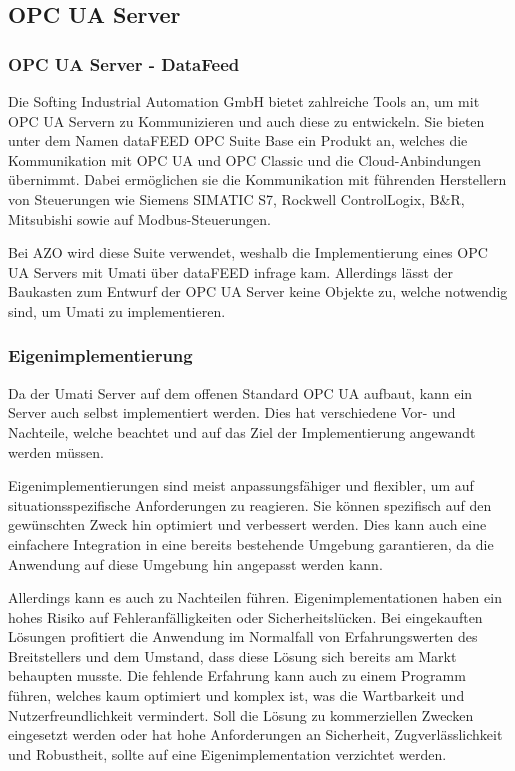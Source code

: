 \documentclass[a4paper, 12pt, oneside, toc=listofnumbered, bibliography=totoc]{scrbook}
\begin{document}
		\subsection{OPC UA Server}
		
			\subsubsection{OPC UA Server - DataFeed}
				
			Die Softing Industrial Automation GmbH bietet zahlreiche Tools an, um mit OPC UA Servern zu Kommunizieren und auch diese zu entwickeln. Sie bieten unter dem Namen dataFEED OPC Suite Base ein Produkt an, welches die Kommunikation mit OPC UA und OPC Classic und die Cloud-Anbindungen übernimmt. Dabei ermöglichen sie die Kommunikation mit führenden Herstellern von Steuerungen wie  Siemens SIMATIC S7, Rockwell ControlLogix, B\&R, Mitsubishi sowie auf Modbus-Steuerungen. \cite{noauthor_datafeed_nodate}
		
			Bei AZO wird diese Suite verwendet, weshalb die Implementierung eines OPC UA Servers mit Umati über dataFEED infrage kam. Allerdings lässt der Baukasten zum Entwurf der OPC UA Server keine Objekte zu, welche notwendig sind, um Umati zu implementieren.
					
			\subsubsection{Eigenimplementierung}
		
					
			Da der Umati Server auf dem offenen Standard OPC UA aufbaut, kann ein Server auch selbst implementiert werden. Dies hat verschiedene Vor- und Nachteile, welche beachtet und auf das Ziel der Implementierung angewandt werden müssen. 
			
			Eigenimplementierungen sind meist anpassungsfähiger und flexibler, um auf situationsspezifische Anforderungen zu reagieren. Sie können spezifisch auf den gewünschten Zweck hin optimiert und verbessert werden. Dies kann auch eine einfachere Integration in eine bereits bestehende Umgebung garantieren, da die Anwendung auf diese Umgebung hin angepasst werden kann.
			
			Allerdings kann es auch zu Nachteilen führen. Eigenimplementationen haben ein hohes Risiko auf Fehleranfälligkeiten oder Sicherheitslücken. Bei eingekauften Lösungen profitiert die Anwendung im Normalfall von Erfahrungswerten des Breitstellers und dem Umstand, dass diese Lösung sich bereits am Markt behaupten musste. Die fehlende Erfahrung kann auch zu einem Programm führen, welches kaum optimiert und komplex ist, was die Wartbarkeit und Nutzerfreundlichkeit vermindert. Soll die Lösung zu kommerziellen Zwecken eingesetzt werden oder hat hohe Anforderungen an Sicherheit, Zugverlässlichkeit und Robustheit, sollte auf eine Eigenimplementation verzichtet werden.
			
\end{document}
